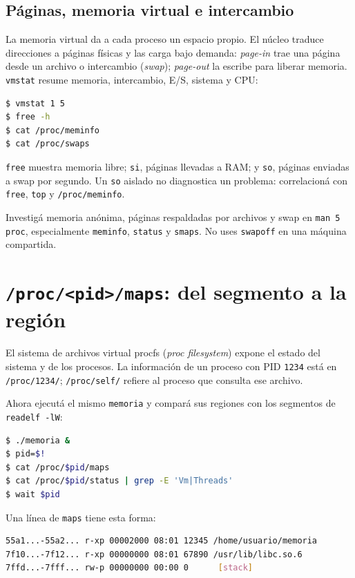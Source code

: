 \documentclass[11pt,a4paper]{article}
\begin{document}
\subsection{Páginas, memoria virtual e intercambio}

La memoria virtual da a cada proceso un espacio propio. El núcleo traduce
direcciones a páginas físicas y las carga bajo demanda: \emph{page-in} trae
una página desde un archivo o intercambio (\emph{swap}); \emph{page-out} la
escribe para liberar memoria. \texttt{vmstat} resume memoria, intercambio,
E/S, sistema y CPU:

\begin{lstlisting}[language=bash]
$ vmstat 1 5
$ free -h
$ cat /proc/meminfo
$ cat /proc/swaps
\end{lstlisting}

\texttt{free} muestra memoria libre; \texttt{si}, páginas llevadas a RAM; y
\texttt{so}, páginas enviadas a swap por segundo. Un \texttt{so} aislado no
diagnostica un problema: correlacioná con \texttt{free}, \texttt{top} y
\texttt{/proc/meminfo}.

\begin{extrabox}
Investigá memoria anónima, páginas respaldadas por archivos y swap en
\texttt{man 5 proc}, especialmente \texttt{meminfo}, \texttt{status} y
\texttt{smaps}. No uses \texttt{swapoff} en una máquina compartida.
\end{extrabox}

\section{\texttt{/proc/<pid>/maps}: del segmento a la región}

El sistema de archivos virtual procfs (\emph{proc filesystem}) expone el
estado del sistema y de los procesos. La información de un proceso con PID
\texttt{1234} está en \texttt{/proc/1234/}; \texttt{/proc/self/} refiere al
proceso que consulta ese archivo.

Ahora ejecutá el mismo \texttt{memoria} y compará sus regiones con los
segmentos de \texttt{readelf -lW}:

\begin{lstlisting}[language=bash]
$ ./memoria &
$ pid=$!
$ cat /proc/$pid/maps
$ cat /proc/$pid/status | grep -E 'Vm|Threads'
$ wait $pid
\end{lstlisting}

Una línea de \texttt{maps} tiene esta forma:

\begin{lstlisting}[language=bash]
55a1...-55a2... r-xp 00002000 08:01 12345 /home/usuario/memoria
7f10...-7f12... r-xp 00000000 08:01 67890 /usr/lib/libc.so.6
7ffd...-7fff... rw-p 00000000 00:00 0      [stack]
\end{lstlisting}
\end{document}
